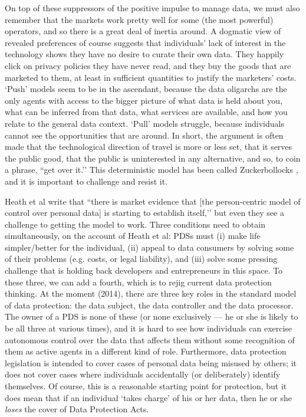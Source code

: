 \documentclass[runningheads,a4paper]{llncs}
\begin{document}
On top of these suppressors of the positive impulse to manage data, we must also remember that the markets work pretty well for some (the most powerful) operators, and so there is a great deal of inertia around. A dogmatic view of revealed preferences of course suggests that individuals’ lack of interest in the technology shows they have no desire to curate their own data. They happily click on privacy policies they have never read, and they buy the goods that are marketed to them, at least in sufficient quantities to justify the marketers’ costs. `Push’ models seem to be in the ascendant, because the data oligarchs are the only agents with access to the bigger picture of what data is held about you, what can be inferred from that data, what services are available, and how you relate to the general data context. `Pull’ models struggle, because individuals cannot see the opportunities that are around. In short, the argument is often made that the technological direction of travel is more or less set, that it serves the public good, that the public is uninterested in any alternative, and so, to coin a phrase, ``get over it.’’ This deterministic model has been called Zuckerbollocks \cite{}, and it is important to challenge and resist it.


Heath et al write \cite{} that ``there is market evidence that [the person-centric model of control over personal data] is starting to establish itself,’’ but even they see a challenge to getting the model to work. Three conditions need to obtain simultaneously, on the account of Heath et al: PDSs must (i) make life simpler/better for the individual, (ii) appeal to data consumers by solving some of their problems (e.g. costs, or legal liability), and (iii) solve some pressing challenge that is holding back developers and entrepreneurs in this space. To these three, we can add a fourth, which is to rejig current data protection thinking. At the moment (2014), there are three key roles in the standard model of data protection: the data subject, the data controller and the data processor. The owner of a PDS is none of these (or none exclusively --- he or she is likely to be all three at various times), and it is hard to see how individuals can exercise autonomous control over the data that affects them without some recognition of them as active agents in a different kind of role. Furthermore, data protection legislation is intended to cover cases of personal data being misused by others; it does not cover cases where individuals accidentally (or deliberately) identify themselves. Of course, this is a reasonable starting point for protection, but it does mean that if an individual `takes charge’ of his or her data, then he or she {\em loses} the cover of Data Protection Acts.
\end{document}
